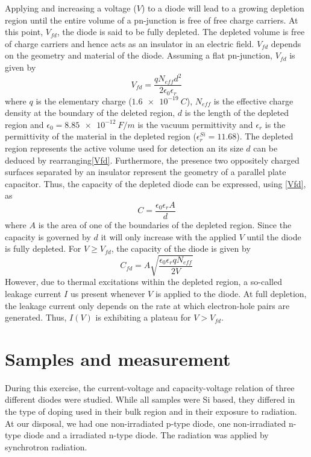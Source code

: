 \documentclass[11pt]{article}
\begin{document}
Applying and increasing a voltage ($V$) to a diode will lead to a growing depletion region until the entire volume of a pn-junction is free of free charge carriers.
At this point, $V_{fd}$, the diode is said to be fully depleted.
The depleted volume is free of charge carriers and hence acts as an insulator in an electric field. $V_{fd}$ depends on the geometry and material of the diode.
Assuming a flat pn-junction, $V_{fd}$ is given by
\begin{equation}
  \label{Vfd}
  V_{fd} = \frac{qN_{eff}d^2}{2\epsilon_0\epsilon_r}
\end{equation}
where $q$ is the elementary charge ($\SI{1.6e-19}{C}$), $N_{eff}$ is the effective charge density at the boundary of the deleted region, $d$ is the length of the depleted region and $\epsilon_0 = \SI{8.85e-12}{F/m}$ is the vacuum permittivity and $\epsilon_r$ is the permittivity of the material in the depleted region ($\epsilon_r^{Si} = 11.68$).
The depleted region represents the active volume used for detection an its size $d$ can be deduced by rearranging\eqref{Vfd}. 
Furthermore, the presence two oppositely charged surfaces separated by an insulator represent the geometry of a parallel plate capacitor. Thus, the capacity of the depleted diode can be expressed, using \eqref{Vfd}, as
\begin{equation}
  \label{C}
  C = \frac{\epsilon_{0}\epsilon_{r}A}{d}
\end{equation}
where $A$ is the area of one of the boundaries of the depleted region. Since the capacity is governed by $d$ it will only increase with the applied $V$ until the diode is fully depleted. For $V \geq V_{fd}$, the capacity of the diode is given by
\begin{equation}
  \label{eq:1}
   C_{fd} = A \sqrt{\frac{\epsilon_0\epsilon_rqN_{eff}}{2V}}
\end{equation}
However, due to thermal excitations within the depleted region, a so-called leakage current $I$  us present whenever $V$ is applied to the diode.
At full depletion, the leakage current only depends on the rate at which electron-hole pairs are generated. Thus, $I(V)$ is exhibiting a plateau for $V>V_{fd}$.

\section{Samples and measurement}
\label{sec:samples}
During this exercise, the current-voltage and capacity-voltage relation of three different diodes were studied. While all samples were Si based, they differed in the type of doping used in their bulk region and in their exposure to radiation.
At our disposal, we had one non-irradiated p-type diode, one non-irradiated n-type diode and a irradiated n-type diode. The radiation was applied by synchrotron radiation. 
\end{document}

